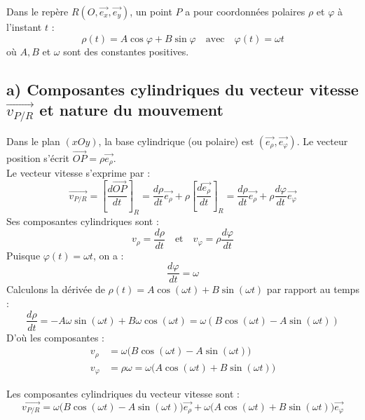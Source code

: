 \documentclass[11pt,a4paper]{article}
\begin{document}
Dans le repère $R(O, \vec{e_x}, \vec{e_y})$, un point $P$ a pour coordonnées polaires $\rho$ et $\varphi$ à l'instant $t$ :
$$ \rho(t) = A \cos\varphi + B \sin\varphi \quad \text{avec} \quad \varphi(t) = \omega t $$
où $A, B$ et $\omega$ sont des constantes positives.

\subsection*{a) Composantes cylindriques du vecteur vitesse $\vec{v_{P/R}}$ et nature du mouvement}
Dans le plan $(xOy)$, la base cylindrique (ou polaire) est $(\vec{e_\rho}, \vec{e_\varphi})$. Le vecteur position s'écrit $\vec{OP} = \rho \vec{e_\rho}$. \\
Le vecteur vitesse s'exprime par :
$$ \vec{v_{P/R}} = \left[\frac{d\vec{OP}}{dt}\right]_R = \frac{d\rho}{dt} \vec{e_\rho} + \rho \left[\frac{d\vec{e_\rho}}{dt}\right]_R = \frac{d\rho}{dt} \vec{e_\rho} + \rho \frac{d\varphi}{dt} \vec{e_\varphi} $$
Ses composantes cylindriques sont :
$$ v_\rho = \frac{d\rho}{dt} \quad \text{et} \quad v_\varphi = \rho \frac{d\varphi}{dt} $$
Puisque $\varphi(t) = \omega t$, on a :
$$ \frac{d\varphi}{dt} = \omega $$
Calculons la dérivée de $\rho(t) = A\cos(\omega t) + B\sin(\omega t)$ par rapport au temps :
$$ \frac{d\rho}{dt} = -A\omega \sin(\omega t) + B\omega \cos(\omega t) = \omega (B\cos(\omega t) - A\sin(\omega t)) $$
D'où les composantes :
\begin{align*}
v_\rho &= \omega \bigl(B\cos(\omega t) - A\sin(\omega t)\bigr) \\
v_\varphi &= \rho \omega = \omega \bigl(A\cos(\omega t) + B\sin(\omega t)\bigr)
\end{align*}

\begin{sonucbox}
Les composantes cylindriques du vecteur vitesse sont :
$$ \vec{v_{P/R}} = \omega\bigl(B\cos(\omega t) - A\sin(\omega t)\bigr) \vec{e_\rho} + \omega\bigl(A\cos(\omega t) + B\sin(\omega t)\bigr) \vec{e_\varphi} $$
\end{sonucbox}
\end{document}
